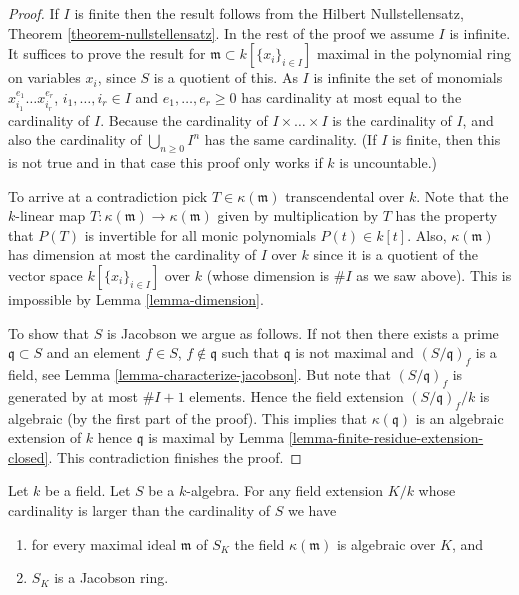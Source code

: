 \begin{proof}
If $I$ is finite then the result follows from the Hilbert Nullstellensatz,
Theorem \ref{theorem-nullstellensatz}. In the rest of the proof we assume
$I$ is infinite. It suffices to prove the result for
$\mathfrak m \subset k[\{x_i\}_{i \in I}]$ maximal in the polynomial
ring on variables $x_i$, since $S$ is a quotient of this.
As $I$ is infinite the set
of monomials $x_{i_1}^{e_1} \ldots x_{i_r}^{e_r}$, $i_1, \ldots, i_r \in I$
and $e_1, \ldots, e_r \geq 0$ has cardinality at most equal to the
cardinality of $I$. Because the cardinality of $I \times \ldots \times I$
is the cardinality of $I$, and also the cardinality of
$\bigcup_{n \geq 0} I^n$ has the same cardinality.
(If $I$ is finite, then this is not true and
in that case this proof only works if $k$ is uncountable.)

\medskip\noindent
To arrive at a contradiction pick $T \in \kappa(\mathfrak m)$ transcendental
over $k$. Note that the $k$-linear map
$T : \kappa(\mathfrak m) \to \kappa(\mathfrak m)$
given by multiplication by $T$ has the property that $P(T)$ is invertible
for all monic polynomials $P(t) \in k[t]$.
Also, $\kappa(\mathfrak m)$ has dimension at most the cardinality of $I$
over $k$ since it is a quotient of the vector space
$k[\{x_i\}_{i \in I}]$ over $k$ (whose dimension is $\# I$ as we saw above).
This is impossible by Lemma \ref{lemma-dimension}.

\medskip\noindent
To show that $S$ is Jacobson we argue as follows. If not then
there exists a prime $\mathfrak q \subset S$ and an element $f \in S$,
$f \not \in \mathfrak q$ such that $\mathfrak q$ is not maximal
and $(S/\mathfrak q)_f$ is a field, see
Lemma \ref{lemma-characterize-jacobson}.
But note that $(S/\mathfrak q)_f$ is generated by at most $\# I + 1$ elements.
Hence the field extension $(S/\mathfrak q)_f/k$ is algebraic
(by the first part of the proof).
This implies that $\kappa(\mathfrak q)$ is an algebraic extension of $k$
hence $\mathfrak q$ is maximal by
Lemma \ref{lemma-finite-residue-extension-closed}. This contradiction
finishes the proof.
\end{proof}

\begin{lemma}
\label{lemma-base-change-Jacobson}
Let $k$ be a field. Let $S$ be a $k$-algebra.
For any field extension $K/k$ whose cardinality is larger
than the cardinality of $S$ we have
\begin{enumerate}
\item for every maximal ideal $\mathfrak m$ of $S_K$ the field
$\kappa(\mathfrak m)$ is algebraic over $K$, and
\item $S_K$ is a Jacobson ring.
\end{enumerate}
\end{lemma}

